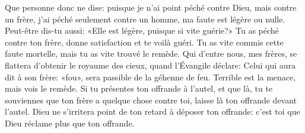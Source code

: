 Que personne donc ne dise:
	puisque je n’ai point péché contre Dieu, mais contre un frère,
	j’ai péché seulement contre un homme, ma faute est légère ou nulle.
Peut-être dis-tu aussi:
	«Elle est légère, puisque si vite guérie?»
Tu as péché contre ton frère, donne satisfaction et te voilà guéri.
	Tu as vite commis cette faute mortelle, mais tu as vite trouvé le remède.
Qui d’entre nous, mes frères, se flattera d’obtenir le royaume des cieux,
	quand l’Évangile déclare:
	Celui qui aura dit à son frère: «fou», sera passible de la géhenne de feu.
Terrible est la menace, mais vois le remède.
Si tu présentes ton offrande à l’autel,
	et que là, tu te souviennes que ton frère a quelque chose contre toi,
	laisse là ton offrande devant l’autel.
Dieu ne s’irritera point de ton retard à déposer ton offrande:
	c’est toi que Dieu réclame plus que ton offrande.
